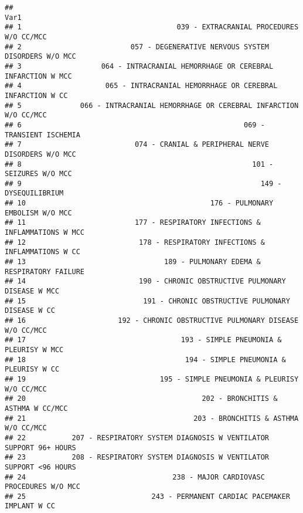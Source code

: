 \documentclass[]{article}
\newenvironment{Shaded}{\begin{snugshade}}{\end{snugshade}}
\newcommand{\KeywordTok}[1]{\textcolor[rgb]{0.13,0.29,0.53}{\textbf{#1}}}
\newcommand{\StringTok}[1]{\textcolor[rgb]{0.31,0.60,0.02}{#1}}
\newcommand{\OperatorTok}[1]{\textcolor[rgb]{0.81,0.36,0.00}{\textbf{#1}}}
\newcommand{\NormalTok}[1]{#1}
\begin{document}
\begin{Shaded}
\end{Shaded}

\begin{verbatim}
##                                                                           Var1
## 1                                     039 - EXTRACRANIAL PROCEDURES W/O CC/MCC
## 2                          057 - DEGENERATIVE NERVOUS SYSTEM DISORDERS W/O MCC
## 3                   064 - INTRACRANIAL HEMORRHAGE OR CEREBRAL INFARCTION W MCC
## 4                    065 - INTRACRANIAL HEMORRHAGE OR CEREBRAL INFARCTION W CC
## 5              066 - INTRACRANIAL HEMORRHAGE OR CEREBRAL INFARCTION W/O CC/MCC
## 6                                                     069 - TRANSIENT ISCHEMIA
## 7                           074 - CRANIAL & PERIPHERAL NERVE DISORDERS W/O MCC
## 8                                                       101 - SEIZURES W/O MCC
## 9                                                         149 - DYSEQUILIBRIUM
## 10                                            176 - PULMONARY EMBOLISM W/O MCC
## 11                          177 - RESPIRATORY INFECTIONS & INFLAMMATIONS W MCC
## 12                           178 - RESPIRATORY INFECTIONS & INFLAMMATIONS W CC
## 13                                 189 - PULMONARY EDEMA & RESPIRATORY FAILURE
## 14                           190 - CHRONIC OBSTRUCTIVE PULMONARY DISEASE W MCC
## 15                            191 - CHRONIC OBSTRUCTIVE PULMONARY DISEASE W CC
## 16                      192 - CHRONIC OBSTRUCTIVE PULMONARY DISEASE W/O CC/MCC
## 17                                     193 - SIMPLE PNEUMONIA & PLEURISY W MCC
## 18                                      194 - SIMPLE PNEUMONIA & PLEURISY W CC
## 19                                195 - SIMPLE PNEUMONIA & PLEURISY W/O CC/MCC
## 20                                          202 - BRONCHITIS & ASTHMA W CC/MCC
## 21                                        203 - BRONCHITIS & ASTHMA W/O CC/MCC
## 22           207 - RESPIRATORY SYSTEM DIAGNOSIS W VENTILATOR SUPPORT 96+ HOURS
## 23           208 - RESPIRATORY SYSTEM DIAGNOSIS W VENTILATOR SUPPORT <96 HOURS
## 24                                   238 - MAJOR CARDIOVASC PROCEDURES W/O MCC
## 25                              243 - PERMANENT CARDIAC PACEMAKER IMPLANT W CC

\end{verbatim}
\end{document}
